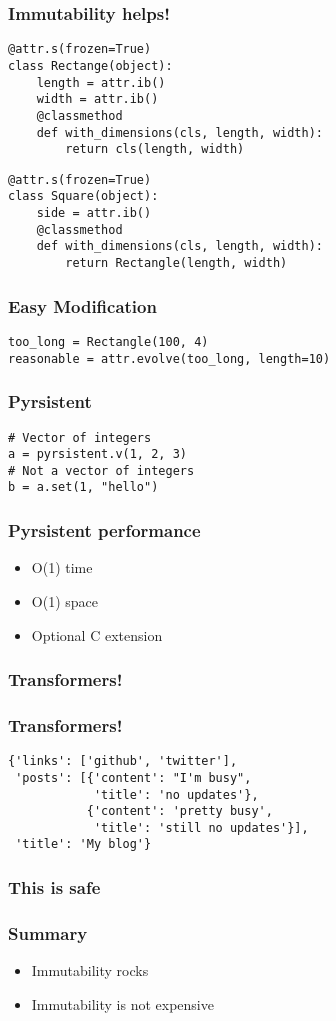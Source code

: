 \documentclass{beamer}
\begin{document}
\begin{frame}[fragile]
\frametitle{Immutability helps!}
\begin{lstlisting}
@attr.s(frozen=True)
class Rectange(object):
    length = attr.ib()
    width = attr.ib()
    @classmethod
    def with_dimensions(cls, length, width):
        return cls(length, width)
\end{lstlisting}\pause
\begin{lstlisting}
@attr.s(frozen=True)
class Square(object):
    side = attr.ib()
    @classmethod
    def with_dimensions(cls, length, width):
        return Rectangle(length, width)
\end{lstlisting}
\end{frame}

\begin{frame}[fragile]
\frametitle{Easy Modification}
\begin{lstlisting}
too_long = Rectangle(100, 4)
reasonable = attr.evolve(too_long, length=10)
\end{lstlisting}
\end{frame}

\begin{frame}[fragile]
\frametitle{Pyrsistent}
\begin{lstlisting}
# Vector of integers
a = pyrsistent.v(1, 2, 3)
# Not a vector of integers
b = a.set(1, "hello")
\end{lstlisting}
\end{frame}

\begin{frame}[fragile]
\frametitle{Pyrsistent performance}
\begin{itemize}
\item O(1) time
\item O(1) space
\item Optional C extension
\end{itemize}
\end{frame}

\begin{frame}[fragile]
\frametitle{Transformers!}

\end{frame}

\begin{frame}[fragile]
\frametitle{Transformers!}
\begin{lstlisting}
{'links': ['github', 'twitter'],
 'posts': [{'content': "I'm busy",
            'title': 'no updates'},
           {'content': 'pretty busy',
            'title': 'still no updates'}],
 'title': 'My blog'}
\end{lstlisting}
\end{frame}

\begin{frame}[fragile]
\frametitle{This is safe}

\end{frame}

\begin{frame}
\frametitle{Summary}
\begin{itemize}
\item Immutability rocks
\item Immutability is not expensive
\end{itemize}
\end{frame}
\end{document}
